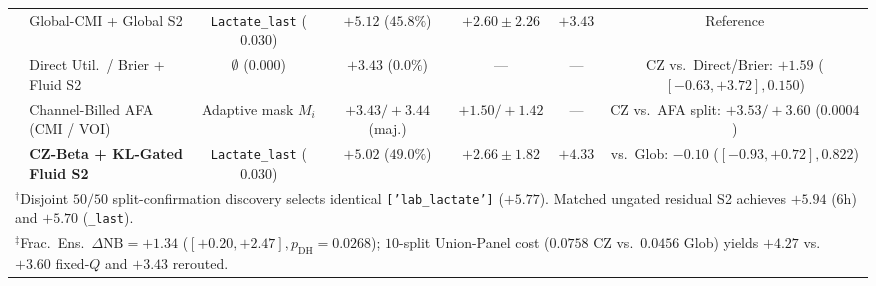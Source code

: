 \documentclass[11pt]{article}
\begin{document}
\begin{table}[t!]
{\begin{tabular}{llccccc}
  & Global-CMI + Global S2 & \texttt{Lactate\_last} ($0.030$) & $\mathbf{+5.12}$ ($45.8\%$) & $+2.60 \pm 2.26$ & $+3.43$ & Reference \\
  & Direct Util.\ / Brier + Fluid S2 & $\emptyset$ ($0.000$) & $+3.43$ ($0.0\%$) & --- & --- & CZ vs.\ Direct/Brier: $+1.59$ ($[-0.63,+3.72], 0.150$) \\
  & Channel-Billed AFA (CMI / VOI) & Adaptive mask $M_i$ & $+3.43 / +3.44$ (maj.) & $+1.50 / +1.42$ & --- & CZ vs.\ AFA split: $\mathbf{+3.53 / +3.60}$ ($\mathbf{0.0004}$) \\
  & \textbf{CZ-Beta + KL-Gated Fluid S2} & \texttt{Lactate\_last} ($0.030$) & $+5.02$ ($49.0\%$) & $\mathbf{+2.66 \pm 1.82}$ & $\mathbf{+4.33}$ & vs.\ Glob: $-0.10$ ($[-0.93,+0.72], 0.822$) \\
\bottomrule
\multicolumn{7}{l}{\footnotesize $^\dagger$Disjoint $50/50$ split-confirmation discovery selects identical \texttt{['lab\_lactate']} ($+5.77$). Matched ungated residual S2 achieves $+5.94$ ($6\text{h}$) and $+5.70$ (\texttt{\_last}).} \\
\multicolumn{7}{l}{\footnotesize $^\ddagger$Frac.\ Ens.\ $\Delta\text{NB}=+1.34$ ($[+0.20,+2.47], p_{\text{DH}}=0.0268$); $10$-split Union-Panel cost ($0.0758$ CZ vs.\ $0.0456$ Glob) yields $+4.27$ vs.\ $+3.60$ fixed-$Q$ and $+3.43$ rerouted.}
\end{tabular}%
}
\end{table}
\end{document}
